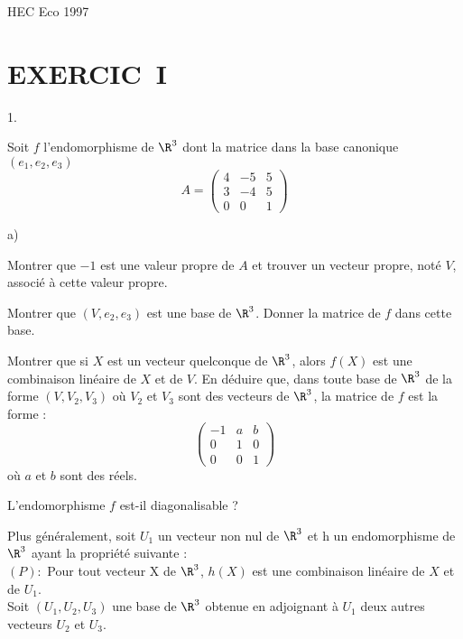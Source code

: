 \documentclass[11pt]{article}%
\begin{document}
\begin{center}
{\huge HEC Eco 1997}
\end{center}

\section*{EXERCIC\E\ I}

\begin{noliste}{1.}
 \setlength{\itemsep}{4mm}
\item Soit $f$ l'endomorphisme de $\R^{3}$ dont la matrice dans la
base canonique $(e_{1},e_{2},e_{3})$
\[
A = \left( 
\begin{array}{ccc}
4 & -5 & 5 \\
3 & -4 & 5 \\
0 & 0 & 1
\end{array}
\right) 
\]

\begin{noliste}{a)}
 \setlength{\itemsep}{2mm}
\item Montrer que $-1$ est une valeur propre de $A$ et trouver un
vecteur
propre, noté $V$, associé à cette valeur propre.

\item Montrer que $(V,e_{2},e_{3})$ est une base de $\R^{3}$. Donner
la matrice de $f$ dans cette base.

\item Montrer que si $X$ est un vecteur quelconque de $\R^{3}$,
alors $f(X)$ est une combinaison linéaire de $X$ et de $V$. En déduire
que,
dans toute base de $\R^{3}$ de la forme $(V,V_{2},V_{3})$ où $V_{2}$
et $V_{3}$ sont des vecteurs de $\R^{3}$, la matrice de $f$ est la
forme :
\[
\left( 
\begin{array}{ccc}
-1 & a & b \\
0 & 1 & 0 \\
0 & 0 & 1
\end{array}
\right) 
\]
où $a$ et $b$ sont des réels.
\end{noliste}

\item L'endomorphisme $f$ est-il diagonalisable ?

\item Plus généralement, soit $U_{1}$ un vecteur non nul de $\R^{3}$
et h un endomorphisme de $\R^{3}$ ayant la propriété suivante :\\
$(P) :$ Pour tout vecteur X de $\R^{3}$, $h(X)$ est une combinaison
linéaire de $X$ et de $U_{1}$.\\
Soit $(U_{1},U_{2},U_{3})$ une base de $\R^{3}$ obtenue en
adjoignant à $U_{1}$ deux autres vecteurs $U_{2}$ et $U_{3}$.


\end{noliste}
\end{document}
